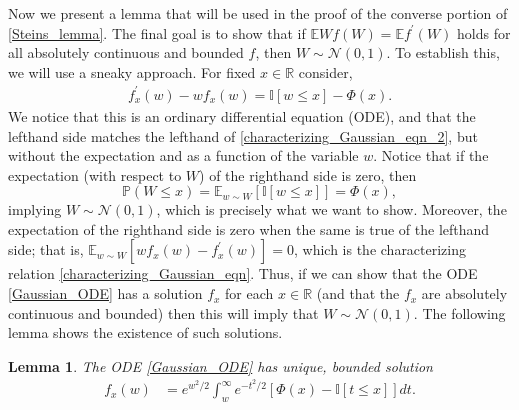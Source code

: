 \documentclass[12pt]{article}
\newcommand{\R}{\mathbb{R}}
\newcommand{\indicator}[1]{\mathbb{I}[#1]}
\newcommand{\E}{\mathbb{E}}
\newcommand{\Prob}{\mathbb{P}}
\newcommand{\Gaussian}{\mathcal{N}}
\newcommand{\GaussianCDF}{\Phi}
\newtheorem{lemma}{Lemma}
\begin{document}
Now we present a lemma that will be used in the proof of the converse portion of \ref{Steins_lemma}. The final goal is to show that if $\E W f(W) = \E f^\prime(W)$ holds for 
all absolutely continuous and bounded $f$, then $W \sim \Gaussian(0, 1)$. To establish this, we will use a sneaky approach. For fixed $x \in \R$ consider, 
\begin{align}
f_x^\prime(w) - wf_x(w) = \indicator{w \leq x} - \GaussianCDF(x). \label{Gaussian_ODE}
\end{align}
We notice that this is an ordinary differential equation (ODE), and that the lefthand side matches the lefthand of \ref{characterizing_Gaussian_eqn_2}, but without the expectation 
and as a function of the variable $w$. Notice that if the expectation (with respect to $W$) of the righthand side is zero, then 
\[
\Prob(W \leq x) = \E_{w \sim W}[\indicator{w \leq x} ] = \GaussianCDF(x),
\]
implying $W \sim \Gaussian(0, 1)$, which is precisely what we want to show. Moreover, the expectation of the righthand side is zero when the same is true of the 
lefthand side; that is, $\E_{w \sim W}[wf_x(w) - f_x^\prime(w)] = 0$, which is the characterizing relation \ref{characterizing_Gaussian_eqn}. Thus, if we can show that the 
ODE \ref{Gaussian_ODE} has a solution $f_x$ for each $x \in \R$ (and that the $f_x$ are absolutely continuous and bounded) then this will imply that $W \sim \Gaussian(0, 1)$. 
The following lemma shows the existence of such solutions. 

\begin{lemma} \label{Gaussian_ODE_lemma}
The ODE \ref{Gaussian_ODE} has unique, bounded solution 
\begin{align}
f_x(w) &= e^{w^2/2} \int_{w}^{\infty} e^{-t^2/2} \left[\GaussianCDF(x) - \indicator{t \leq x} \right] dt.
\end{align}
\end{lemma}
\end{document}
